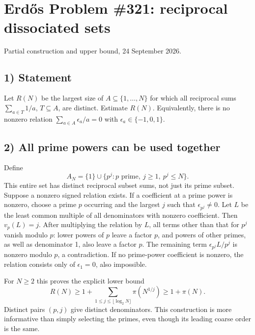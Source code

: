 \section{Erd\H{o}s Problem \#321: reciprocal dissociated sets}
\noindent Partial construction and upper bound, 24 September 2026.

\subsection*{1) Statement}
Let $R(N)$ be the largest size of $A\subseteq\{1,\ldots,N\}$ for which all reciprocal sums $\sum_{a\in T}1/a$, $T\subseteq A$, are distinct. Estimate $R(N)$. Equivalently, there is no nonzero relation $\sum_{a\in A}\epsilon_a/a=0$ with $\epsilon_a\in\{-1,0,1\}$.

\subsection*{2) All prime powers can be used together}
Define
\[A_N=\{1\}\cup\{p^j:p\text{ prime},\ j\ge1,\ p^j\le N\}.
\]
This entire set has distinct reciprocal subset sums, not just its prime subset. Suppose a nonzero signed relation exists. If a coefficient at a prime power is nonzero, choose a prime $p$ occurring and the largest $j$ such that $\epsilon_{p^j}\ne0$. Let $L$ be the least common multiple of all denominators with nonzero coefficient. Then $v_p(L)=j$. After multiplying the relation by $L$, all terms other than that for $p^j$ vanish modulo $p$: lower powers of $p$ leave a factor $p$, and powers of other primes, as well as denominator 1, also leave a factor $p$. The remaining term $\epsilon_{p^j}L/p^j$ is nonzero modulo $p$, a contradiction. If no prime-power coefficient is nonzero, the relation consists only of $\epsilon_1=0$, also impossible.

For $N\ge2$ this proves the explicit lower bound
\[R(N)\ge1+\sum_{1\le j\le\lfloor\log_2N\rfloor}\pi(N^{1/j})\ge1+\pi(N).
\tag{1}\]
Distinct pairs $(p,j)$ give distinct denominators. This construction is more informative than simply selecting the primes, even though its leading coarse order is the same.

